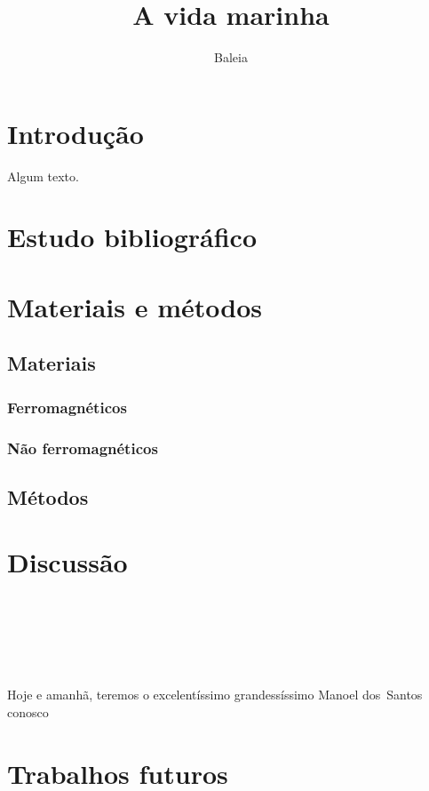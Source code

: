 \documentclass[12pt,article,oneside]{memoir}
\begin{document}
\title{A vida marinha}
\author{Baleia}
\maketitle

\tableofcontents


\chapter{Introdução}
Algum texto.
\newpage

\chapter{Estudo bibliográfico}
\newpage

\chapter{Materiais e métodos}

\section{Materiais}
\subsection{Ferromagnéticos}
\subsection{Não ferromagnéticos}

\section{Métodos}
\newpage


\chapter{Discussão}
\newpage
~
 
\newpage
~ 
 
\newpage
~ 

\newpage

Hoje e amanhã, teremos o excelentíssimo grandessíssimo Manoel dos~Santos conosco

\chapter{Trabalhos futuros}
\end{document}
